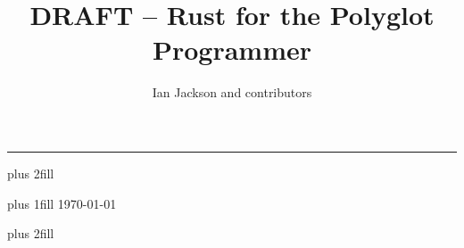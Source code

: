 \documentclass[a4paper]{memoir}
\title{DRAFT -- Rust for the Polyglot Programmer}
\author{Ian Jackson and contributors}
\begin{document}
\frontmatter

\begin{titlingpage}
  \addtolength{\oddsidemargin}{-\leftindent/2}
  \addtolength{\evensidemargin}{-\leftindent/2}

  \hrule height 0pt
  \vskip 0pt plus 2fill
  \begingroup
    \fontsize{32pt}{40pt}   \selectfont
    \raggedright \thetitle \par
  \endgroup
  \vskip 0pt plus 1fill
  \begingroup
    \fontsize{18pt}{22pt}   
    \selectfont
    \raggedleft
    \theauthor
    \vskip 8pt
    \fontsize{12pt}{15pt} \selectfont \today \par
  \endgroup
  \vskip 0pt plus 2fill
  
\end{titlingpage}

\tableofcontents

\cleardoublepage
\mainmatter















\backmatter

\end{document}
